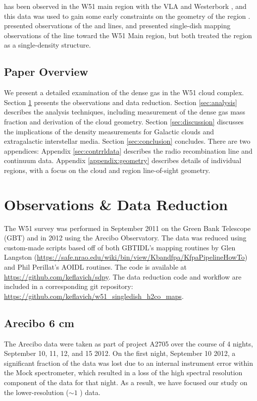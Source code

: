 \formaldehyde \oneone has been observed in the W51 main region with the VLA
\citep{Martin-Pintado1985a} and Westerbork \citep{Arnal1985a}, and this data
was used to gain some early constraints on the geometry of the region
\citep[e.g.][]{Carpenter1998a}.  \citet{Henkel1980a} presented observations of
the \oneone and \twotwo lines, and \citet{Martin-Pintado1985b} presented
single-dish mapping observations of the \formaldehyde \twotwo line toward the
W51 Main region, but both treated the region as a single-density structure.


\subsection{Paper Overview} 
We present a detailed examination of the dense gas in the W51 cloud complex.
Section \ref{sec:observations} presents the observations and data reduction.
Section \ref{sec:analysis} describes the analysis techniques, including
measurement of the dense gas mass fraction and derivation of the cloud
geometry.  Section \ref{sec:discussion} discusses the implications of the
density measurements for Galactic clouds and extragalactic interstellar media.
Section \ref{sec:conclusion} concludes.  There are two appendices: Appendix
\ref{sec:contrrldata} describes the radio recombination line and continuum
data.  Appendix \ref{appendix:geometry} describes details of individual
regions, with a focus on
the cloud and \hii region line-of-sight geometry.


\section{Observations \& Data Reduction}
\label{sec:observations}
The W51 survey was performed in September 2011 on the Green Bank Telescope
(GBT) and in 2012 using the Arecibo Observatory.  
The data was reduced using custom-made scripts based off of both GBTIDL's
mapping routines by Glen Langston
(\url{https://safe.nrao.edu/wiki/bin/view/Kbandfpa/KfpaPipelineHowTo}) and Phil
Perillat's AOIDL routines.  The code is available at
\url{https://github.com/keflavich/sdpy}.  The data reduction code and workflow
are included in a corresponding git repository:
\url{https://github.com/keflavich/w51_singledish_h2co_maps}.

\subsection{Arecibo 6 cm}
The Arecibo data were taken as part of project A2705 over the course of 4
nights, September 10, 11, 12, and 15 2012.  On the first night, September 10
2012, a significant fraction of the data was lost due to an internal instrument
error within the Mock spectrometer, which resulted in a loss of the
high spectral resolution component of the \formaldehyde data for that night.  As a
result, we have focused our study on the lower-resolution ($\sim1$ \kms) data.

